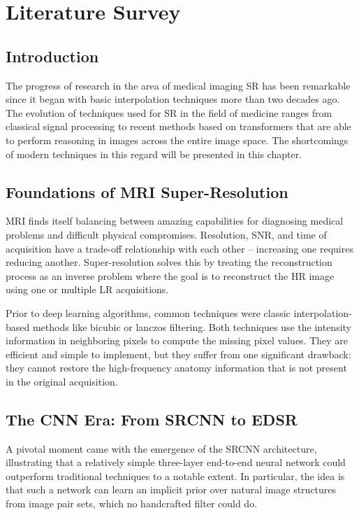 \chapter{Literature Survey}

\section{Introduction}
The progress of research in the area of medical imaging SR has been remarkable since it began with basic interpolation techniques more than two decades ago. The evolution of techniques used for SR in the field of medicine ranges from classical signal processing to recent methods based on transformers that are able to perform reasoning in images across the entire image space. The shortcomings of modern techniques in this regard will be presented in this chapter.

\section{Foundations of MRI Super-Resolution}
MRI finds itself balancing between amazing capabilities for diagnosing medical problems and difficult physical compromises. Resolution, SNR, and time of acquisition have a trade-off relationship with each other – increasing one requires reducing another. Super-resolution solves this by treating the reconstruction process as an inverse problem where the goal is to reconstruct the HR image using one or multiple LR acquisitions.

Prior to deep learning algorithms, common techniques were classic interpolation-based methods like bicubic or lanczos filtering. Both techniques use the intensity information in neighboring pixels to compute the missing pixel values. They are efficient and simple to implement, but they suffer from one significant drawback: they cannot restore the high-frequency anatomy information that is not present in the original acquisition.

\section{The CNN Era: From SRCNN to EDSR}
A pivotal moment came with the emergence of the SRCNN architecture, illustrating that a relatively simple three-layer end-to-end neural network could outperform traditional techniques to a notable extent. In particular, the idea is that such a network can learn an implicit prior over natural image structures from image pair sets, which no handcrafted filter could do.

